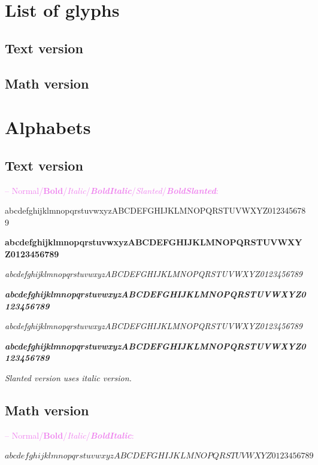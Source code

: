 \documentclass[a4paper]{scrartcl}
\newcommand{\abc}{abcdefghijklmnopqrstuvwxyz}
\newcommand{\ABC}{ABCDEFGHIJKLMNOPQRSTUVWXYZ}
\newcommand{\samplenumbers}{0123456789}
\begin{document}
\pagebreak

\section{List of glyphs}

\subsection{Text version}


\pagebreak

\subsection{Math version}


\pagebreak

\section{Alphabets}

\subsection{Text version}

\textcolor{violet}{-- Normal/\textbf{Bold}/\textit{Italic}/\textit{\textbf{BoldItalic}}/\textsl{Slanted}/\textsl{\textbf{BoldSlanted}}:}

\abc\ABC\samplenumbers

\textbf{\abc\ABC\samplenumbers}

\textit{\abc\ABC\samplenumbers}

\textit{\textbf{\abc\ABC\samplenumbers}}

\textsl{\abc\ABC\samplenumbers}

\textsl{\textbf{\abc\ABC\samplenumbers}}

\smallskip

\textit{Slanted version uses italic version.}

\subsection{Math version}

\textcolor{violet}{-- Normal/\textbf{Bold}/\textit{Italic}/\textit{\textbf{BoldItalic}}:}

$\abc\ABC\samplenumbers$
\end{document}
